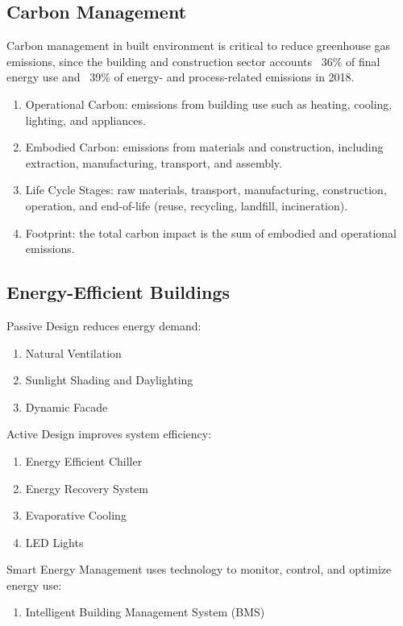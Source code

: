 \documentclass[12pt, a4paper]{article}
\begin{document}
\begin{multicols*}{3}
\section{Carbon Management}

Carbon management in built environment is critical to reduce greenhouse gas emissions, since the building and construction sector accounts ~36\% of final energy use and ~39\% of energy- and process-related  emissions in 2018. 
\begin{enumerate}[\roman*.]
  \item Operational Carbon: emissions from building use such as heating, cooling, lighting, and appliances.
  \item Embodied Carbon: emissions from materials and construction, including extraction, manufacturing, transport, and assembly.
  \item Life Cycle Stages: raw materials, transport, manufacturing, construction, operation, and end-of-life (reuse, recycling, landfill, incineration).
  \item Footprint: the total carbon impact is the sum of embodied and operational emissions.
\end{enumerate}

\subsection{Energy-Efficient Buildings}
{Passive Design} reduces energy demand:
\begin{enumerate}[\roman*.]
  \item Natural Ventilation 
  \item Sunlight Shading and Daylighting
  \item Dynamic Facade
\end{enumerate}

{Active Design} improves system efficiency:
\begin{enumerate}[\roman*.]
  \item Energy Efficient Chiller 
  \item Energy Recovery System 
  \item Evaporative Cooling 
  \item LED Lights
\end{enumerate}

{Smart Energy Management} uses technology to monitor, control, and optimize energy use:
\begin{enumerate}[\roman*.]
  \item Intelligent Building Management System (BMS)
\end{enumerate}


\end{multicols*}
\end{document}
